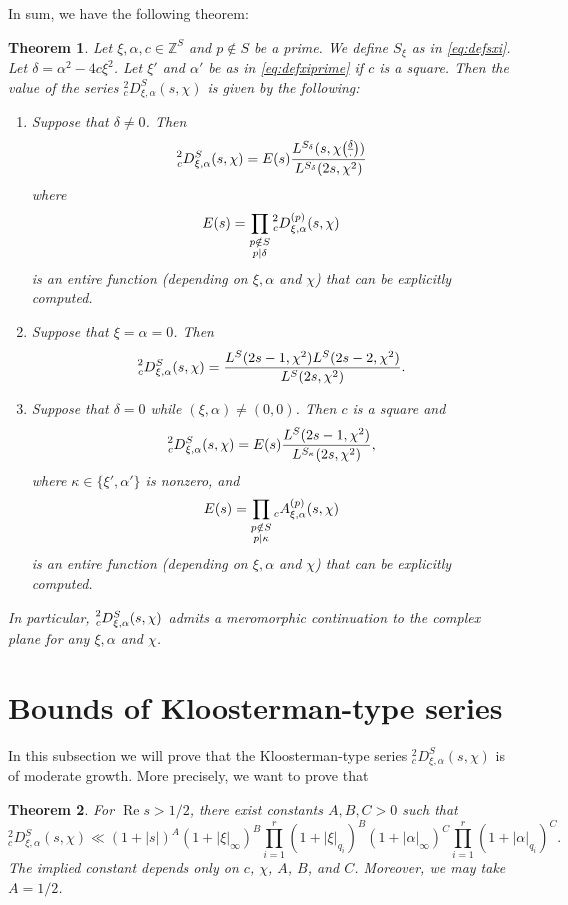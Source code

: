 \documentclass[10pt,oneside,reqno]{amsart}
\newcommand\ZZ{\mathbb{Z}}
\renewcommand\Re{\mathop{\mathrm{Re}}}
\newcommand\legendresymbol[2]{\genfrac{(}{)}{}{}{#1}{#2}}
\theoremstyle{THEOREM}
\newtheorem{theorem}{Theorem}[section]
\theoremstyle{DEFINITION}
\theoremstyle{EXERCISE}
\numberwithin{equation}{section}
\begin{document}
In sum, we have the following theorem:
\begin{theorem}\label{thm:kloostermantypeseries}
Let $\xi,\alpha,c\in \ZZ^S$ and $p\notin S$ be a prime. We define
$S_\xi$ as in \eqref{eq:defsxi}. Let $\delta=\alpha^2-4c\xi^2$. Let $\xi'$ and $\alpha'$ be as in \eqref{eq:defxiprime} if $c$ is a square.
Then the value of the series ${}_c^2D_{\xi,\alpha}^S(s,\chi)$ is given by the following:
\begin{enumerate}[itemsep=0pt,parsep=0pt,topsep=0pt, leftmargin=0pt,labelsep=2.5pt,itemindent=15pt,label=\upshape{(\arabic*)}]
  \item\label{item:610firstterm} Suppose that $\delta\neq 0$. Then 
  \[
  \prescript{2}{c}D_{\xi,\alpha}^{S}(s,\chi)=E(s) \frac{L^{S_\delta}(s,\chi \legendresymbol{\delta}{\cdot})}{L^{S_\delta}(2s,\chi^2)}
  \]
  where 
\[
E(s)=\prod_{\substack{p\notin S\\p\mid\delta}}\prescript{2}{c}D_{\xi,\alpha}^{(p)}(s,\chi) 
\]
is an entire function (depending on $\xi,\alpha$ and $\chi$) that can be explicitly computed.
\item\label{item:610secondterm} Suppose that $\xi=\alpha=0$. Then 
  \[
  \prescript{2}{c}D_{\xi,\alpha}^{S}(s,\chi)=\frac{L^S(2s-1,\chi^2)L^S(2s-2,\chi^2)}{L^S(2s,\chi^2)}.
  \]
\item\label{item:610thirdterm} Suppose that $\delta=0$ while $(\xi,\alpha)\neq (0,0)$. Then $c$ is a square and
  \[
  \prescript{2}{c}D_{\xi,\alpha}^{S}(s,\chi)=E(s)\frac{L^{S}(2s-1,\chi^2)}{L^{S_{\kappa}}(2s,\chi^2)},
  \]
  where $\kappa\in \{\xi',\alpha'\}$ is nonzero, and 
  \[
  E(s)=\prod_{\substack{p\notin S\\ p\mid \kappa}}\prescript{}{c}{A}_{\xi,\alpha}^{(p)}(s,\chi)
  \] 
  is an entire function (depending on $\xi,\alpha$ and $\chi$) that can be explicitly computed.
\end{enumerate}
In particular, $\prescript{2}{c}D_{\xi,\alpha}^{S}(s,\chi)$ admits a meromorphic continuation to the complex plane for any $\xi,\alpha$ and $\chi$.
\end{theorem}


\section{Bounds of Kloosterman-type series}
In this subsection we will prove that the Kloosterman-type series $_c^2D_{\xi,\alpha}^S(s,\chi)$ is of moderate growth. More precisely, we want to prove that
\begin{theorem}\label{thm:kloostermanmoderate}
For $\Re s>1/2$, there exist constants $A,B,C>0$ such that
\[
_c^2D_{\xi,\alpha}^S(s,\chi)\ll (1+|s|)^A(1+|\xi|_\infty)^B\prod_{i=1}^{r}(1+|\xi|_{q_i})^B (1+|\alpha|_\infty)^C\prod_{i=1}^{r}(1+|\alpha|_{q_i})^C.
\]
The implied constant depends only on $c$, $\chi$, $A$, $B$, and $C$. Moreover, we may take $A=1/2$.
\end{theorem}
\end{document}
